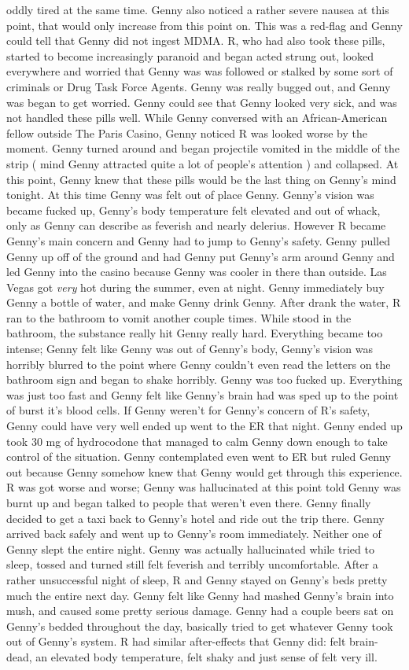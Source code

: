 \documentclass[12pt]{book}
\begin{document}
oddly tired at the same time. Genny also noticed a rather severe nausea at this point, that would only increase from this point on. This was a red-flag and Genny could tell that Genny did not ingest MDMA. R, who had also took these pills, started to become increasingly paranoid and began acted strung out, looked everywhere and worried that Genny was was followed or stalked by some sort of criminals or Drug Task Force Agents. Genny was really bugged out, and Genny was began to get worried. Genny could see that Genny looked very sick, and was not handled these pills well. While Genny conversed with an African-American fellow outside The Paris Casino, Genny noticed R was looked worse by the moment. Genny turned around and began projectile vomited in the middle of the strip ( mind Genny attracted quite a lot of people's attention ) and collapsed. At this point, Genny knew that these pills would be the last thing on Genny's mind tonight. At this time Genny was felt out of place Genny. Genny's vision was became fucked up, Genny's body temperature felt elevated and out of whack, only as Genny can describe as feverish and nearly delerius. However R became Genny's main concern and Genny had to jump to Genny's safety. Genny pulled Genny up off of the ground and had Genny put Genny's arm around Genny and led Genny into the casino because Genny was cooler in there than outside. Las Vegas got \emph{very} hot during the summer, even at night. Genny immediately buy Genny a bottle of water, and make Genny drink Genny. After drank the water, R ran to the bathroom to vomit another couple times. While stood in the bathroom, the substance really hit Genny really hard. Everything became too intense; Genny felt like Genny was out of Genny's body, Genny's vision was horribly blurred to the point where Genny couldn't even read the letters on the bathroom sign and began to shake horribly. Genny was too fucked up. Everything was just too fast and Genny felt like Genny's brain had was sped up to the point of burst it's blood cells. If Genny weren't for Genny's concern of R's safety, Genny could have very well ended up went to the ER that night. Genny ended up took 30 mg of hydrocodone that managed to calm Genny down enough to take control of the situation. Genny contemplated even went to ER but ruled Genny out because Genny somehow knew that Genny would get through this experience. R was got worse and worse; Genny was hallucinated at this point told Genny was burnt up and began talked to people that weren't even there. Genny finally decided to get a taxi back to Genny's hotel and ride out the trip there. Genny arrived back safely and went up to Genny's room immediately. Neither one of Genny slept the entire night. Genny was actually hallucinated while tried to sleep, tossed and turned still felt feverish and terribly uncomfortable. After a rather unsuccessful night of sleep, R and Genny stayed on Genny's beds pretty much the entire next day. Genny felt like Genny had mashed Genny's brain into mush, and caused some pretty serious damage. Genny had a couple beers sat on Genny's bedded throughout the day, basically tried to get whatever Genny took out of Genny's system. R had similar after-effects that Genny did: felt brain-dead, an elevated body temperature, felt shaky and just sense of felt very ill. 
\end{document}
